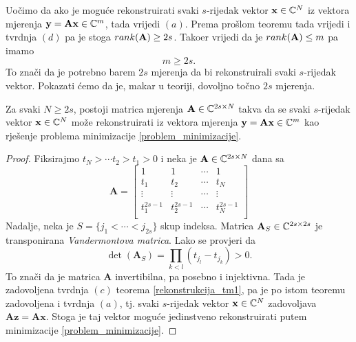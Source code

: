 \documentclass[a4paper,twoside,12pt]{memoir} %
\newcommand{\vect}[1]{\mathbf{#1}}
\renewcommand{\vec}{\vect}
\newcommand{\rank}{\text\normalfont{rank}}
\begin{document}
Uo\v{c}imo da ako je mogu\'ce rekonstruirati svaki $s$-rijedak vektor $\vec x \in \C^N$ iz vektora mjerenja $\vec y = \vec{Ax} \in \C^m$, tada vrijedi $(a)$. Prema pro\v{s}lom teoremu tada vrijedi i tvrdnja $(d)$ pa je stoga $\rank(\vec A) \geq 2s$. Tako\dj er vrijedi da je $\rank(\vec A) \leq m$ pa imamo 
\begin{equation*}
    m \geq 2s.    
\end{equation*}
To zna\v{c}i da je potrebno barem $2s$ mjerenja da bi rekonstruirali svaki $s$-rijedak vektor. Pokazati \'cemo da je, makar u teoriji, dovoljno to\v{c}no $2s$ mjerenja.

\begin{thm}
    Za svaki $N \geq 2s$, postoji matrica mjerenja $\vec A \in \C^{2s \times N}$ takva da se svaki $s$-rijedak vektor $\vec x \in \C^N$ mo\v{z}e rekonstruirati iz vektora mjerenja $\vec y = \vec{Ax} \in \C^m$ kao rje\v{s}enje problema minimizacije \eqref{problem_minimizacije}.
\end{thm}
\begin{proof}
    Fiksirajmo $t_N>\cdots t_2 > t_1 > 0$ i neka je $\vec A \in \C^{2s \times N}$ dana sa
    \begin{equation}\label{vandermont_matrica}
        \vec A = 
        \begin{bmatrix}
            1 & 1 & \cdots & 1 \\ 
            t_1 & t_2 & \cdots & t_N \\
            \vdots & \vdots & \cdots & \vdots \\
            t_1^{2s-1} & t_2^{2s-1} & \cdots & t_N^{2s-1} \\
        \end{bmatrix}
    \end{equation}
    Nadalje, neka je $S=\{j_1 < \cdots < j_{2s}\}$ skup indeksa. Matrica $\vec A_S \in \C^{2s \times 2s}$ je transponirana \textit{Vandermontova matrica}. Lako se provjeri da
    \begin{equation*}
        \det(\vec{A}_S) = \prod_{k < l} (t_{j_l} - t_{j_k})>0.
    \end{equation*}
    To zna\v{c}i da je matrica $\vec A$ invertibilna, pa posebno i injektivna. Tada je zadovoljena tvrdnja $(c)$ teorema \ref{rekonstrukcija_tm1}, pa je po istom teoremu zadovoljena i tvrdnja $(a)$, tj. svaki $s$-rijedak vektor $\vec x \in \C^N$ zadovoljava $\vec{Az}=\vec{Ax}$. Stoga je taj vektor mogu\'ce jedinstveno rekonstruirati putem minimizacije \eqref{problem_minimizacije}.
\end{proof}
\end{document}
